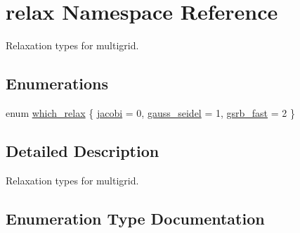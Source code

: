 \hypertarget{namespacerelax}{}\section{relax Namespace Reference}
\label{namespacerelax}


Relaxation types for multigrid.  


\subsection*{Enumerations}
\begin{DoxyCompactItemize}
\item 
enum \hyperlink{namespacerelax_a1b017edf55c06d103aa5b61e015fe219}{which\+\_\+relax} \{ \hyperlink{namespacerelax_a1b017edf55c06d103aa5b61e015fe219a1073c20e3821cec05d1066df068d31b9}{jacobi} = 0, 
\hyperlink{namespacerelax_a1b017edf55c06d103aa5b61e015fe219a700230972d3f799f1bb7d8275715ee13}{gauss\+\_\+seidel} = 1, 
\hyperlink{namespacerelax_a1b017edf55c06d103aa5b61e015fe219a9f7cf3af97cc2038d3aceba1dbd02c7b}{gsrb\+\_\+fast} = 2
 \}
\end{DoxyCompactItemize}


\subsection{Detailed Description}
Relaxation types for multigrid. 

\subsection{Enumeration Type Documentation}
